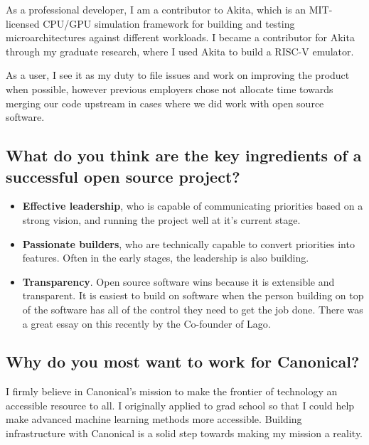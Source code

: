 \documentclass{article}
\begin{document}
As a professional developer, I am a contributor to Akita\cite{akita}, which is
an MIT-licensed CPU/GPU simulation framework for building and testing
microarchitectures against different workloads. I became a contributor for Akita
through my graduate research, where I used Akita to build a RISC-V emulator.

As a user, I see it as my duty to file issues and work on improving the product
when possible, however previous employers chose not allocate time towards
merging our code upstream in cases where we did work with open source software.

\subsection{What do you think are the key ingredients of a successful open
    source project?}

\begin{itemize}
    \item \textbf{Effective leadership}, who is capable of communicating
          priorities based on a strong vision, and running the project well at it's
          current stage.
    \item \textbf{Passionate builders}, who are technically capable to convert priorities
          into features. Often in the early stages, the leadership is also building.
    \item \textbf{Transparency}. Open source software wins because it is
          extensible and transparent. It is easiest to build on software when the
          person building on top of the software has all of the control they need to
          get the job done. There was a great essay on this recently by the Co-founder
          of Lago\cite{oss_cheap}.
\end{itemize}

\subsection{Why do you most want to work for Canonical?}


I firmly believe in Canonical's mission to make the frontier of technology an accessible
resource to all. I originally applied to grad school so that I could help make advanced
machine learning methods more accessible. Building infrastructure with Canonical is a
solid step towards making my mission a reality.
\end{document}
